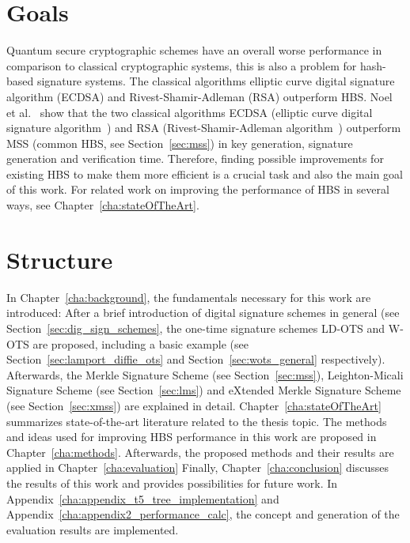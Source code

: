 \section{Goals} 
Quantum secure cryptographic schemes have an overall worse performance in comparison to classical cryptographic systems, %
this is also a problem for hash-based signature systems. The classical algorithms elliptic curve digital signature algorithm (ECDSA) and Rivest-Shamir-Adleman (RSA) outperform HBS. Noel et al.~\cite{comparison_performance_RSA_ECDSA_Merkle_WOTS_2021} show that the two classical algorithms ECDSA (elliptic curve digital signature algorithm~\cite{ecdsa_main_paper_2001}) and RSA (Rivest-Shamir-Adleman algorithm~\cite{rsa_patent}) outperform MSS (common HBS, see Section~\ref{sec:mss}) in key generation, signature generation and verification time.
Therefore, finding possible improvements for existing HBS to make them more efficient is a crucial task and also the main goal of this work.
For related work on improving the performance of HBS in several ways, see Chapter~\ref{cha:stateOfTheArt}.

\section{Structure}
In Chapter~\ref{cha:background}, the fundamentals necessary for this work are introduced: After a brief introduction of digital signature schemes in general (see Section~\ref{sec:dig_sign_schemes}, the one-time signature schemes LD-OTS and W-OTS are proposed, including a basic example (see Section~\ref{sec:lamport_diffie_ots} and Section~\ref{sec:wots_general} respectively). Afterwards, the Merkle Signature Scheme (see Section~\ref{sec:mss}), Leighton-Micali Signature Scheme (see Section~\ref{sec:lms}) and eXtended Merkle Signature Scheme (see Section~\ref{sec:xmss}) are explained in detail. Chapter~\ref{cha:stateOfTheArt} summarizes state-of-the-art literature related to the thesis topic. 
The methods and ideas used for improving HBS performance in this work are proposed in Chapter~\ref{cha:methods}. Afterwards, the proposed methods and their results are applied in Chapter~\ref{cha:evaluation} 
Finally, Chapter~\ref{cha:conclusion} discusses the results of this work and provides possibilities for future work.
In Appendix~\ref{cha:appendix_t5_tree_implementation} and Appendix~\ref{cha:appendix2_performance_calc}, the \extree concept and generation of the evaluation results are implemented.